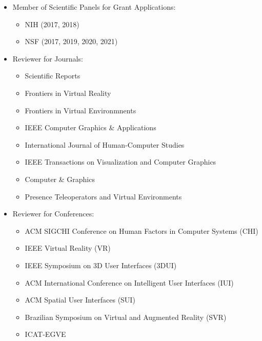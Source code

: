 \documentclass[wideaddress]{vitae}
\begin{document}
\begin{itemize}
	\item Member of Scientific Panels for Grant Applications:
		\begin{itemize}
			\item{NIH (2017, 2018)}
			\item{NSF (2017, 2019, 2020, 2021)}
		\end{itemize}
	\item Reviewer for Journals:
		\begin{itemize}
			\item{Scientific Reports}
			\item{Frontiers in Virtual Reality}
			\item{Frontiers in Virtual Environmnents}
			\item{IEEE Computer Graphics \& Applications}
			\item{International Journal of Human-Computer Studies}
			\item{IEEE Transactions on Visualization and Computer Graphics}
			\item{Computer \& Graphics}
			\item{Presence Teleoperators and Virtual Environments}
		\end{itemize}
	\item Reviewer for Conferences:
		\begin{itemize}
			\item{ACM SIGCHI Conference on Human Factors in Computer Systems (CHI)}
			\item{IEEE Virtual Reality (VR)}
			\item{IEEE Symposium on 3D User Interfaces (3DUI)}
			\item{ACM International Conference on Intelligent User Interfaces (IUI)}
			\item{ACM Spatial User Interfaces (SUI)}
			\item{Brazilian Symposium on Virtual and Augmented Reality (SVR)}
			\item{ICAT-EGVE}
		\end{itemize}
\end{itemize}
\end{document}

